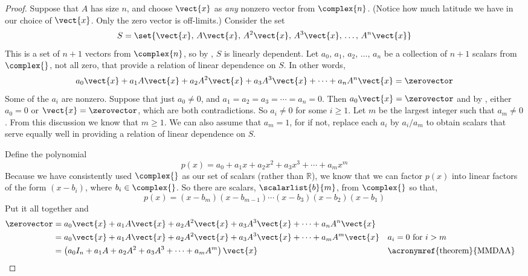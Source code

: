 \begin{proof}
Suppose that $A$ has size $n$, and choose $\vect{x}$ as {\em any} nonzero vector from $\complex{n}$.  (Notice how much latitude we have in our choice of $\vect{x}$.  Only the zero vector is off-limits.)  Consider the set
%
\begin{equation*}
S=\set{\vect{x},\,A\vect{x},\,A^2\vect{x},\,A^3\vect{x},\,\ldots,\,A^n\vect{x}}
\end{equation*}
%
This is a set of $n+1$ vectors from $\complex{n}$, so by , $S$ is linearly dependent.  Let $a_0,\,a_1,\,a_2,\,\ldots,\,a_n$ be a collection of $n+1$ scalars from $\complex{\null}$, not all zero, that provide a relation of linear dependence on $S$.  In other words, 
%
\begin{equation*}
a_0\vect{x}+a_1A\vect{x}+a_2A^2\vect{x}+a_3A^3\vect{x}+\cdots+a_nA^n\vect{x}=\zerovector
\end{equation*}
%
Some of the $a_i$ are nonzero.  Suppose that just $a_0\neq 0$, and $a_1=a_2=a_3=\cdots=a_n=0$.  Then $a_0\vect{x}=\zerovector$ and by , either $a_0=0$ or $\vect{x}=\zerovector$, which are both contradictions.  So $a_i\neq 0$ for some $i\geq 1$.  Let $m$ be the largest integer such that $a_m\neq 0$.  From this discussion we know that $m\geq 1$.  We can also assume that $a_m=1$, for if not, replace each $a_i$ by $a_i/a_m$ to obtain scalars that serve equally well in providing a relation of linear dependence on $S$.\par
%
Define the polynomial
%
\begin{equation*}
p(x)=a_0+a_1x+a_2x^2+a_3x^3+\cdots+a_mx^m
\end{equation*}
%
Because we have consistently used $\complex{\null}$ as our set of scalars (rather than ${\mathbb R}$), we know that we can factor $p(x)$ into linear factors of the form $(x-b_i)$, where $b_i\in\complex{\null}$.  So there are scalars, $\scalarlist{b}{m}$, from $\complex{\null}$ so that,
%
\begin{equation*}
p(x)=(x-b_m)(x-b_{m-1})\cdots(x-b_3)(x-b_2)(x-b_1)
\end{equation*}
%
Put it all together and
%
\begin{align*}
\zerovector&=a_0\vect{x}+a_1A\vect{x}+a_2A^2\vect{x}+a_3A^3\vect{x}+\cdots+a_nA^n\vect{x}\\
&=a_0\vect{x}+a_1A\vect{x}+a_2A^2\vect{x}+a_3A^3\vect{x}+\cdots+a_mA^m\vect{x}&&\text{$a_i=0$ for $i>m$}\\
&=\left(a_0I_n+a_1A+a_2A^2+a_3A^3+\cdots+a_mA^m\right)\vect{x}&&\text{\acronymref{theorem}{MMDAA}}\\

\end{align*}
\end{proof}
